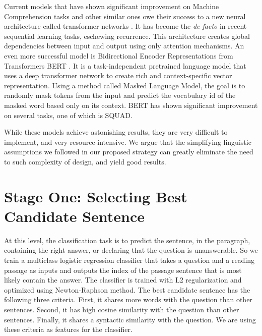 Current models that have shown significant improvement on Machine Comprehension tasks and other similar ones owe their success to a new neural architecture called transformer networks \citep{DBLP:journals/corr/VaswaniSPUJGKP17}. It has become the \emph{de facto} in recent sequential learning tasks, eschewing recurrence. This architecture creates global dependencies between input and output using only attention mechanisms. An even more successful model is Bidirectional Encoder Representations from Transformers BERT \citep{DBLP:journals/corr/abs-1810-04805}. It is a task-independent pretrained language model that uses a deep transformer network to create rich and context-specific vector representation. Using a method called Masked Language Model, the goal is to randomly mask tokens from the input and predict the vocabulary id of the masked word based only on its context. BERT has shown significant improvement on several tasks, one of which is SQUAD. 

While these models achieve astonishing results, they are very difficult to implement, and very resource-intensive. We argue that the simplifying linguistic assumptions we followed in our proposed strategy can greatly eliminate the need to such complexity of design, and yield good results. 


\section{Stage One: Selecting Best Candidate Sentence}

At this level, the classification task is to predict the sentence, in the paragraph, containing the right answer, or declaring that the question is unanswerable. So we train a multiclass logistic regression classifier that takes a question and a reading passage as inputs and outputs the index of the passage sentence that is most likely contain the answer. The classifier is trained with L2 regularization and optimized using Newton-Raphson method. The best candidate sentence has the following three criteria. First, it shares more words with the question than other sentences. Second, it has high cosine similarity with the question than other sentences. Finally, it shares a syntactic similarity with the question. We are using these criteria as features for the classifier. 

